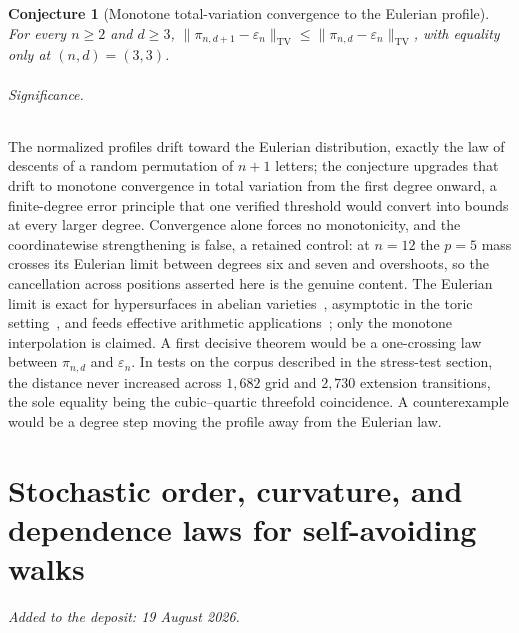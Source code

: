 \documentclass[11pt]{article}
\newtheorem{conjecture}{Conjecture}
\theoremstyle{definition}
\begin{document}
\begin{conjecture}[Monotone total-variation convergence to the Eulerian profile]\label{ae15}
For every $n\ge2$ and $d\ge3$, $\|\pi_{n,d+1}-\varepsilon_n\|_{\mathrm{TV}}\le\|\pi_{n,d}-\varepsilon_n\|_{\mathrm{TV}}$, with equality only at $(n,d)=(3,3)$.
\end{conjecture}

\paragraph{Significance.}
The normalized profiles drift toward the Eulerian distribution, exactly the law of descents of a random permutation of $n+1$ letters; the conjecture upgrades that drift to monotone convergence in total variation from the first degree onward, a finite-degree error principle that one verified threshold would convert into bounds at every larger degree.  Convergence alone forces no monotonicity, and the coordinatewise strengthening is false, a retained control: at $n=12$ the $p=5$ mass crosses its Eulerian limit between degrees six and seven and overshoots, so the cancellation across positions asserted here is the genuine content.  The Eulerian limit is exact for hypersurfaces in abelian varieties~\cite{LS25}, asymptotic in the toric setting~\cite{DK86}, and feeds effective arithmetic applications~\cite{Ji24}; only the monotone interpolation is claimed.  A first decisive theorem would be a one-crossing law between $\pi_{n,d}$ and $\varepsilon_n$.  In tests on the corpus described in the stress-test section, the distance never increased across $1{,}682$ grid and $2{,}730$ extension transitions, the sole equality being the cubic--quartic threefold coincidence.  A counterexample would be a degree step moving the profile away from the Eulerian law.


\part{Stochastic order, curvature, and dependence laws for self-avoiding walks}

\medskip\noindent\emph{Added to the deposit: 19 August 2026.}\par\medskip
\end{document}
